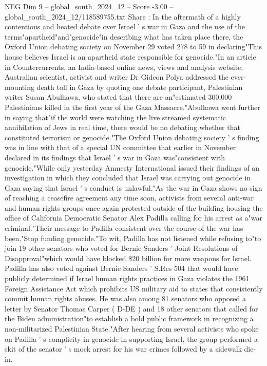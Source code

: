 \begin{textsample}{NEG Dim 9 – global\_south\_2024\_12 – Score -3.00 – global\_south\_2024\_12/118589755.txt}  \label{ex:f9_neg_134}
Share : In the aftermath of a highly contentious and heated debate over Israel ' s war in Gaza and the use of the terms"apartheid"and"genocide"in describing what has taken place there, the Oxford Union debating society on November 29 voted 278 to 59 in declaring"This house believes Israel is an apartheid state responsible for genocide."In an article in Countercurrents, an India-based online news, views and analysis website, Australian scientist, activist and writer Dr Gideon Polya addressed the ever-mounting death toll in Gaza by quoting one debate participant, Palestinian writer Susan Abulhawa, who stated that there are an"estimated 300,000 Palestinians killed in the first year of the Gaza Massacre."Abulhawa went further in saying that"if the world were watching the live streamed systematic annihilation of Jews in real time, there would be no debating whether that constituted terrorism or genocide."The Oxford Union debating society ' s finding was in line with that of a special UN committee that earlier in November declared in its findings that Israel ' s war in Gaza was"consistent with genocide."While only yesterday Amnesty International issued their findings of an investigation in which they concluded that Israel was carrying out genocide in Gaza saying that Israel ' s conduct is unlawful."As the war in Gaza shows no sign of reaching a ceasefire agreement any time soon, activists from several anti-war and human rights groups once again protested outside of the building housing the office of California Democratic Senator Alex Padilla calling for his arrest as a"war criminal."Their message to Padilla consistent over the course of the war has been,"Stop funding genocide."To wit, Padilla has not listened while refusing to"to join 19 other senators who voted for Bernie Sanders ' Joint Resolutions of Disapproval"which would have blocked \$20 billion for more weapons for Israel.
Padilla has also voted against Bernie Sanders ' S.Res 504 that would have publicly determined if Israel human rights practices in Gaza violates the 1961 Foreign Assistance Act which prohibits US military aid to states that consistently commit human rights abuses.
He was also among 81 senators who opposed a letter by Senator Thomas Carper ( D-DE ) and 18 other senators that called for the Biden administration"to establish a bold public framework in recognizing a non-militarized Palestinian State."After hearing from several activists who spoke on Padilla ' s complicity in genocide in supporting Israel, the group performed a skit of the senator ' s mock arrest for his war crimes followed by a sidewalk die-in.

\end{textsample}
